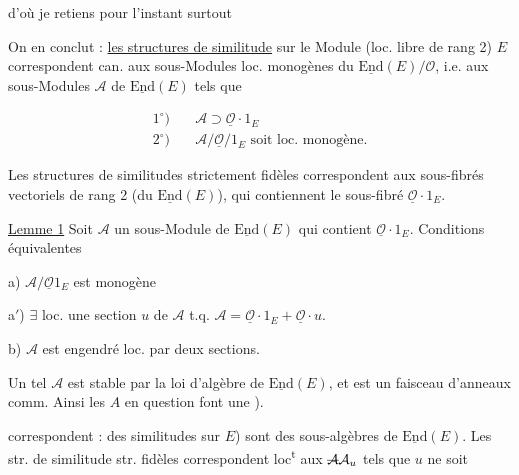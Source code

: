d'où je retiens pour l'instant surtout


On en conclut : \uline{les structures de similitude} sur le Module (loc. libre de rang 2) $E$ correspondent can. aux sous-Modules loc. monogènes du  $\underline{\mathrm{End}}(E)/\mathcal O$, i.e. aux sous-Modules $\mathcal A$ de $\underline{\mathrm{End}}(E)$ tels que

\[
\begin{aligned}
1^\circ)&\quad\mathcal A\supset\underline{\mathcal O}\cdot1_E\\
2^\circ)&\quad\mathcal A/\underline{\mathcal O}/1_E \text{ soit loc. monogène.}
\end{aligned}
\]

Les structures de similitudes strictement fidèles correspondent aux sous-fibrés vectoriels de rang 2 (du  $\underline{\mathrm{End}}(E)$), qui contiennent le sous-fibré $\underline{\mathcal O}\cdot1_E$.

\uline{Lemme 1} Soit $\mathcal A$ un sous-Module de $\underline{\mathrm{End}}(E)$ qui contient $\underline{\mathcal O}\cdot1_E$. Conditions équivalentes

a) $\mathcal A/\underline{\mathcal O}1_E$ est monogène

a$'$) $\exists$ loc. une section $u$ de $\mathcal A$ t.q. $\mathcal A=\underline{\mathcal O}\cdot1_E+\underline{\mathcal O}\cdot u$.

b) $\mathcal A$ est engendré loc. par deux sections.


Un tel $\mathcal A$ est stable par  la loi d'algèbre de $\underline{\mathrm{End}}(E)$, et est un faisceau d'anneaux comm. Ainsi  les $A$ en question  font une ). 

correspondent : des  similitudes sur $E$) sont des sous-algèbres  de $\underline{\mathrm{End}}(E)$. Les str. de similitude str. fidèles correspondent loc\textsuperscript{t} aux $\deleted{\mathcal A}\mathcal A_u$  tels que $u$ ne soit


